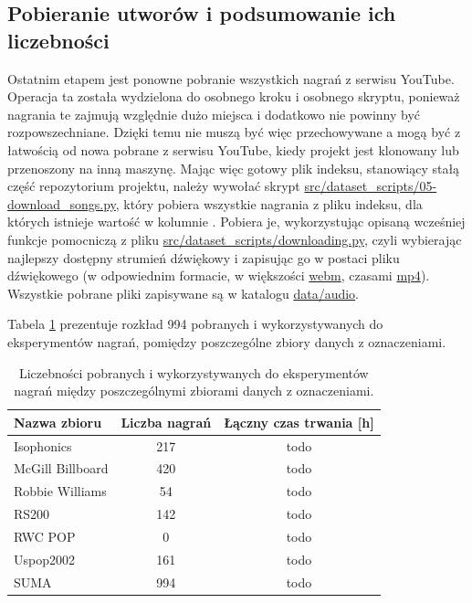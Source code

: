 \subsection{Pobieranie utworów i podsumowanie ich liczebności}
Ostatnim etapem jest ponowne pobranie wszystkich nagrań z serwisu YouTube. Operacja ta została
wydzielona do osobnego kroku i osobnego skryptu, ponieważ nagrania te zajmują względnie dużo miejsca
i dodatkowo nie powinny być rozpowszechniane. Dzięki temu nie muszą być więc przechowywane a mogą
być z łatwością od nowa pobrane z serwisu YouTube, kiedy projekt jest klonowany lub przenoszony na
inną maszynę. Mając więc gotowy plik indeksu, stanowiący stałą część repozytorium projektu, należy
wywołać skrypt \url{src/dataset\_scripts/05-download\_songs.py}, który pobiera wszystkie nagrania z
pliku indeksu, dla których istnieje wartość w kolumnie . Pobiera je, wykorzystując
opisaną wcześniej funkcje pomocniczą z pliku \url{src/dataset\_scripts/downloading.py}, czyli
wybierając najlepszy dostępny strumień dźwiękowy i zapisując go w postaci pliku dźwiękowego (w
odpowiednim formacie, w większości \url{webm}, czasami \url{mp4}). Wszystkie pobrane pliki
zapisywane są w katalogu \url{data/audio}.

Tabela \ref{tab:datasets2} prezentuje rozkład 994 pobranych i wykorzystywanych do eksperymentów
nagrań, pomiędzy poszczególne zbiory danych z oznaczeniami.

\begin{table}
    \centering
    \caption{Liczebności pobranych i wykorzystywanych do eksperymentów nagrań między poszczególnymi zbiorami danych z oznaczeniami.}
    \label{tab:datasets2}
    \begin{tabular}{|l|c|c|}
        \hline
        Nazwa zbioru & Liczba nagrań & Łączny czas trwania [h] \\
        \hline
        Isophonics          & 217 & todo \\
        McGill Billboard    & 420 & todo \\
        Robbie Williams     & 54 & todo \\
        RS200               & 142 & todo \\
        RWC POP             & 0 & todo \\
        Uspop2002           & 161 & todo \\
        \hline
        SUMA                & 994 & todo \\
        \hline
    \end{tabular}
\end{table}

